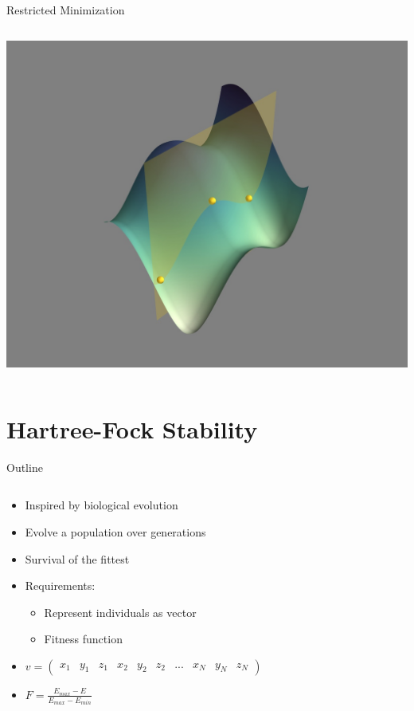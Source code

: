 \documentclass[10pt]{beamer}
\begin{document}
{{\begin{frame}{Restricted Minimization}
\begin{columns}[c]
\begin{column}{0.48\textwidth}
\begin{overprint}
				\includegraphics[width=0.9\linewidth, trim={7cm, 2cm, 7cm, 3cm}, clip]{../images/const_opt_nonstationary.jpeg}
			\end{overprint}
		\end{column}	
	\end{columns}
\end{frame}

\section{Hartree-Fock Stability}

{%
\begin{frame}{Outline}
	\begin{columns}[c] %
		\begin{column}{.48\textwidth}
			\begin{itemize}
				\item {Inspired by biological evolution}
				\item {Evolve a population over generations}
				\item {Survival of the fittest}
				\item {Requirements:}
				\begin{itemize}
					\item {Represent individuals as vector}
					\item {Fitness function}
				\end{itemize}
				\item{$v = \left(\begin{smallmatrix}
					x_1 & y_1 & z_1 & x_2 &  y_2 & z_2 &
					... & x_N & y_N & z_N
					\end{smallmatrix}\right)$}
				\item{$F = \frac{E_{max} - E}{E_{max} - E_{min}}$}
			\end{itemize}


\end{column}
\end{columns}
\end{frame}}}}
\end{document}
